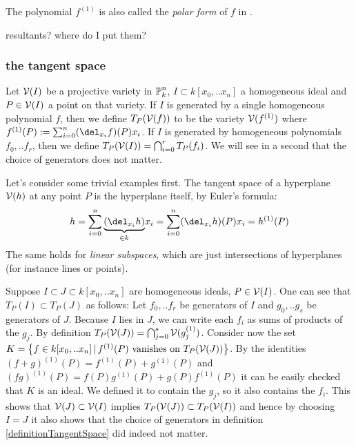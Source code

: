 \begin{remark}
The polynomial $f^{(1)}$ is also called the \emph{polar form} of $f$ in \cite[p. 104]{reid1988undergraduate}.
\end{remark}

\begin{todo}
\item resultants? where do I put them?
\end{todo}


\subsubsection{the tangent space}

\begin{definition} \label{definitionTangentSpace}
Let $\operatorname{\mathcal V}(I)$ be a projective variety in $\operatorname{\mathbb P}^n_k$, $I \subset k[x_0,..x_n]$ a homogeneous ideal and $P\in \operatorname{\mathcal V}(I)$ a point on that variety.
If $I$ is generated by a single homogeneous polynomial $f$, then we define $T_P(\operatorname{\mathcal V}(f))$ to be the variety $\operatorname{\mathcal V}(f^{(1)})$ where $f^{(1)}(P) := \sum_{i=0}^n (\del_{x_i}f)(P)x_i$.
If $I$ is generated by homogeneous polynomials $f_0,..f_r$, then we define $T_P(\operatorname{\mathcal V}(I)) = \bigcap_{i=0}^r T_P(f_i)$.
We will see in a second that the choice of generators does not matter.
\end{definition}

\begin{example} \label{exampleTangentPlaneOfLinearSubsets}
Let's consider some trivial examples first.
The tangent space of a hyperplane $\operatorname{\mathcal V}(h)$ at any point $P$ is the hyperplane itself, by Euler's formula:
\begin{equation}
h = \sum_{i=0}^n \underset{\in k}{\underbrace{(\del_{x_i}h)}}x_i = \sum_{i=0}^n (\del_{x_i}h)(P) x_i = h^{(1)}(P)
\end{equation}
The same holds for \emph{linear subspaces}, which are just intersections of hyperplanes (for instance lines or points).
\end{example}

\begin{example}
Suppose $I \subset J \subset k[x_0,..x_n]$ are homogeneous ideals, $P \in \operatorname{\mathcal V}(I)$.
One can see that $T_P(I) \subset T_P(J)$ as follows: Let $f_0,..f_r$ be generators of $I$ and $g_0,..g_s$ be generators of $J$.
Because $I$ lies in $J$, we can write each $f_i$ as sums of products of the $g_j$.
By definition $T_P(\operatorname{\mathcal V}(J)) = \bigcap_{j=0}^s \operatorname{\mathcal V}(g_j^{(1)})$.
Consider now the set $K = \left\lbrace f \in k[x_0,..x_n] \,|\, f^{(1)}(P) \text{ vanishes on }T_P(\operatorname{\mathcal V}(J))\right\rbrace$.
By the identities $(f+g)^{(1)}(P) = f^{(1)}(P) + g^{(1)}(P)$ and $(fg)^{(1)}(P) = f(P)g^{(1)}(P) + g(P)f^{(1)}(P)$ it can be easily checked that $K$ is an ideal.
We defined it to contain the $g_j$, so it also contains the $f_i$.
This shows that $\operatorname{\mathcal V}(J) \subset \operatorname{\mathcal V}(I)$ implies $T_P(\operatorname{\mathcal V}(J)) \subset T_P(\operatorname{\mathcal V}(I))$ and hence by choosing $I=J$ it also shows that the choice of generators in definition \ref{definitionTangentSpace} did indeed not matter.
\end{example}


